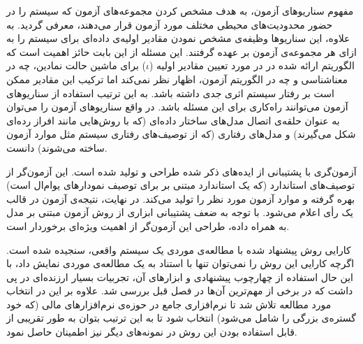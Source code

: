 \begin{strict_itemize}
\item مفهوم سناریوهای آزمون، به هدف مشخص کردن مجموعه‌های آزمون که سیستم را در حضور محدودیت‌های محیطی مختلف مورد آزمون قرار می‌دهند، معرفی گردید. به علاوه، این سناریوها وظیفه‌ی مشخص نمودن مقادیر اولیه‌ی داده‌ای برای سیستم را به ازای هر مجموعه‌ی آزمون بر عهده گرفتند. این مسئله از این بابت حائز اهمیت است که الگوریتم ارائه شده در \cite{FTW05} در مورد تعیین مقادیر اولیه ($\iota$) برای ماشین حالت نمادین، چه در معناشناسی و چه در الگوریتم آزمون، اظهار نظر نمی‌کند اما ترکیب این مقادیر ممکن است بر رفتار سیستم اثری جدی داشته باشد. به این ترتیب استفاده از سناریو‌های آزمون می‌توانند راه‌کاری برای این مسئله باشد. در واقع سناریوهای آزمون را می‌توان به عنوان حلقه‌ی اتصال مدل‌های ساختار داده‌ای (که با روش‌هایی مانند افراز رده‌ای شکل می‌گیرند) و مدل‌های رفتاری (که از توصیف‌های رفتاری سیستم مثل موارد آزمون ساخته می‌شوند) دانست.

\item آزمون‌گری با پشتیبانی از ایده‌های ذکر شده طراحی و تولید شده است. این آزمون‌گر از توصیف‌های استاندارد  (که یک استاندارد مبتنی بر  برای توصیف نمودارهای یوام‌ال است) بهره گرفته و موارد آزمون  مورد نظر را تولید می‌کند. در نهایت، نتیجه‌ی آزمون در قالب یک رأی اعلام می‌شود. با توجه به ضعف پشتیبانی ابزاری از روش آزمون مبتنی بر مدل به همراه داده، طراحی این آزمون‌گر از اهمیت ویژه‌ای برخوردار است.

\item کارایی روش پیشنهاد شده با مطالعه‌ی موردی یک سیستم واقعی، سنجیده شده است. اگرچه کارایی این روش را نمی‌توان تنها با استناد به یک مطالعه‌ی موردی نمایش داد،‌ با این حال استفاده از چهارچوب پیشنهادی و ابزارهای آن، تجربیات بسیار ارزنده‌ای در پی داشت که در برخی از مهم‌ترین ‌آن‌ها در فصل قبل بررسی شد. علاوه بر این در انتخاب مورد مطالعه تلاش شد تا نرم‌افزاری جامع در حوزه‌ی نرم‌افزارهای مالی (که خود گستره‌ی بزرگی را شامل می‌شود) انتخاب شود تا به این ترتیب بتوان به طور تقریبی از قابل استفاده بودن این روش در نمونه‌های دیگر نیز اطمینان حاصل نمود.
\end{strict_itemize}

